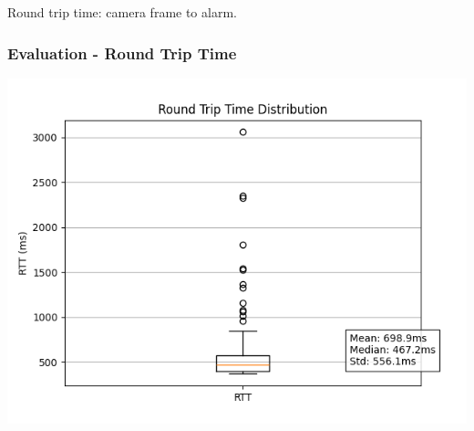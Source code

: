 \documentclass{beamer}
\begin{document}
\begin{frame}
    Round trip time: camera frame to alarm.
    \frametitle{Evaluation - Round Trip Time}

    \begin{center}
        \includegraphics[width=0.8\linewidth]{./res/rtt_distribution.png}        
    \end{center}
\end{frame}
\end{document}
